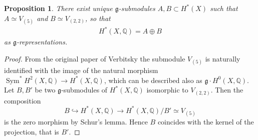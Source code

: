 \documentclass[a4paper,11pt]{amsart}
\newcommand{\Q}{{\mathbb Q}}
\newcommand{\V}[2]{V_{(#1,#2)}}
\newcommand{\Ver}{V_{(5)}}
\newcommand{\kg}{{\mathfrak g}}
\DeclareMathOperator{\Sym}{Sym}
\theoremstyle{plain}
\newtheorem{proposition}[satz]{Proposition}
\theoremstyle{remark}
\begin{document}
    \begin{proposition}\label{prop:AB-decomposition}
        There exist unique $\mathfrak g$-submodules $A,B \subset H^*(X)$ such that $A \simeq V_{(5)}$ and $B \simeq V_{(2,2)}$, so that 
        \begin{align}\label{decomposition}
            H^*(X,\mathbb{Q}) = A \oplus B
        \end{align}
        as $\kg$-representations. 
    \end{proposition}
    \begin{proof}
        From the original paper of Verbitsky \cite{Ver90} the submodule $\Ver$ is naturally identified with the image of the natural morphism $\Sym^* H^2(X,\Q) \to H^*(X,\Q)$, which can be described also as $\mathfrak g \cdot H^0(X,\Q)$. Let $B, B'$ be two $\mathfrak g$-submodules of $H^*(X,\Q)$ isomorphic to $\V22$. Then the composition 
        \[
        B\hookrightarrow H^*(X,\Q) \to H^*(X,\Q)/B' \simeq \Ver
        \]
        is the zero morphism by Schur's lemma. Hence $B$ coincides with the kernel of the projection, that is $B'$.
    \end{proof}
 
\end{document}

